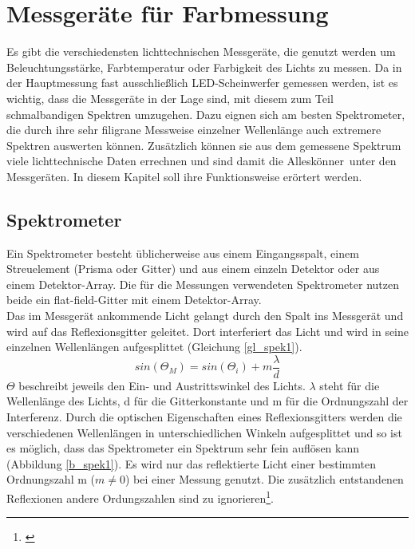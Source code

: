 \chapter{Messgeräte für Farbmessung}
Es gibt die verschiedensten lichttechnischen Messgeräte, die genutzt werden um Beleuchtungsstärke, Farbtemperatur oder Farbigkeit des Lichts zu messen. Da in der Hauptmessung fast ausschließlich LED-Scheinwerfer gemessen werden, ist es wichtig, dass die Messgeräte in der Lage sind, mit diesem zum Teil schmalbandigen Spektren umzugehen. Dazu eignen sich am besten Spektrometer, die durch ihre sehr filigrane Messweise einzelner Wellenlänge auch extremere Spektren auswerten können. Zusätzlich können sie aus dem gemessene Spektrum viele lichttechnische Daten errechnen und sind damit die \glqq Alleskönner\grqq\ unter den Messgeräten. In diesem Kapitel soll ihre Funktionsweise erörtert werden.
 
\section{Spektrometer}
Ein Spektrometer besteht üblicherweise aus einem Eingangsspalt, einem Streuelement (Prisma oder Gitter) und aus einem einzeln Detektor oder aus einem Detektor-Array. Die für die Messungen verwendeten Spektrometer nutzen beide ein flat-field-Gitter mit einem Detektor-Array.\\
Das im Messgerät ankommende Licht gelangt durch den Spalt  ins Messgerät und wird auf das Reflexionsgitter geleitet. Dort interferiert das Licht und wird in seine einzelnen Wellenlängen aufgesplittet (Gleichung \ref{gl_spek1}).
\begin{equation}\label{gl_spek1}
		sin(\Theta_{M})=sin(\Theta_{i})+m \frac{\lambda}{d}
\end{equation}
$\Theta$ beschreibt jeweils den Ein- und Austrittswinkel des Lichts. $\lambda$ steht für die Wellenlänge des Lichts, d für die Gitterkonstante und m für die Ordnungszahl der Interferenz. Durch die optischen Eigenschaften eines Reflexionsgitters werden die verschiedenen Wellenlängen in unterschiedlichen Winkeln aufgesplittet und so ist es möglich, dass das Spektrometer ein Spektrum sehr fein auflösen kann (Abbildung \ref{b_spek1}). Es wird nur das reflektierte Licht einer bestimmten Ordnungszahl m ($m \neq 0$) bei einer Messung genutzt. Die zusätzlich entstandenen Reflexionen andere Ordungszahlen sind zu ignorieren\footnote{\cite[6]{jeti}}. 

